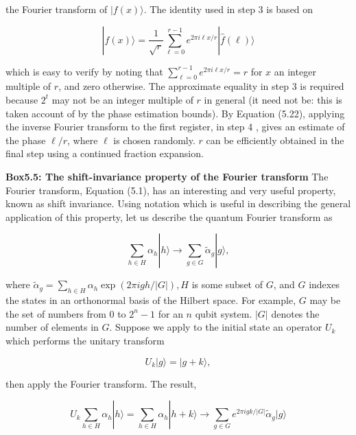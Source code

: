the Fourier transform of $|f(x)\rangle$. The identity used in step 3 is based on

\begin{equation}
    |f(x)\rangle=\frac{1}{\sqrt{r}} \sum_{\ell=0}^{r-1} e^{2 \pi i \ell x / r}|\hat{f}(\ell)\rangle \tag{5.64}
\end{equation}

which is easy to verify by noting that $\sum_{\ell=0}^{r-1} e^{2 \pi i \ell x / r}=r$ for $x$ an integer multiple of $r$, and zero otherwise. The approximate equality in step 3 is required because $2^{t}$ may not be an integer multiple of $r$ in general (it need not be: this is taken account of by the phase estimation bounds). By Equation (5.22), applying the inverse Fourier transform to the first register, in step 4 , gives an estimate of the phase $\ell / r$, where $\ell$ is chosen randomly. $r$ can be efficiently obtained in the final step using a continued fraction expansion.

\textbf{Box5.5: The shift-invariance property of the Fourier transform}
The Fourier transform, Equation (5.1), has an interesting and very useful property, known as shift invariance. Using notation which is useful in describing the general application of this property, let us describe the quantum Fourier transform as

\begin{equation}
    \sum_{h \in H} \alpha_{h}|h\rangle \rightarrow \sum_{g \in G} \tilde{\alpha}_{g}|g\rangle, \tag{5.65}
\end{equation}

where $\tilde{\alpha}_{g}=\sum_{h \in H} \alpha_{h} \exp (2 \pi i g h /|G|), H$ is some subset of $G$, and $G$ indexes the states in an orthonormal basis of the Hilbert space. For example, $G$ may be the set of numbers from 0 to $2^{n}-1$ for an $n$ qubit system. $|G|$ denotes the number of elements in $G$. Suppose we apply to the initial state an operator $U_{k}$ which performs the unitary transform

\begin{equation}
    U_{k}|g\rangle=|g+k\rangle, \tag{5.66}
\end{equation}

then apply the Fourier transform. The result,

\begin{equation}
    U_{k} \sum_{h \in H} \alpha_{h}|h\rangle=\sum_{h \in H} \alpha_{h}|h+k\rangle \rightarrow \sum_{g \in G} e^{2 \pi i g k /|G|} \tilde{\alpha}_{g}|g\rangle \tag{5.67}
\end{equation}


